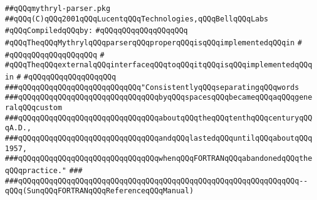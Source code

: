 \label{src/lib/compiler/front/parser/main/mythryl-parser.pkg}
\verb|##qQQqmythryl-parser.pkg|\newline
\verb|##qQQq(C)qQQq2001qQQqLucentqQQqTechnologies,qQQqBellqQQqLabs|\newline
\newline
\verb|#qQQqCompiledqQQqby:|\newline
\verb|#qQQqqQQqqQQqqQQqqQQq|\newline
\newline
\newline
\newline
\verb|#qQQqTheqQQqMythrylqQQqparserqQQqproperqQQqisqQQqimplementedqQQqin|\newline
\verb|#|\newline
\verb|#qQQqqQQqqQQqqQQqqQQq|\newline
\verb|#|\newline
\verb|#qQQqTheqQQqexternalqQQqinterfaceqQQqtoqQQqitqQQqisqQQqimplementedqQQqin|\newline
\verb|#|\newline
\verb|#qQQqqQQqqQQqqQQqqQQq|\newline
\newline
\newline
\newline
\verb|###qQQqqQQqqQQqqQQqqQQqqQQqqQQq"ConsistentlyqQQqseparatingqQQqwords|\newline
\verb|###qQQqqQQqqQQqqQQqqQQqqQQqqQQqqQQqbyqQQqspacesqQQqbecameqQQqaqQQqgeneralqQQqcustom|\newline
\verb|###qQQqqQQqqQQqqQQqqQQqqQQqqQQqqQQqaboutqQQqtheqQQqtenthqQQqcenturyqQQqA.D.,|\newline
\verb|###qQQqqQQqqQQqqQQqqQQqqQQqqQQqqQQqandqQQqlastedqQQquntilqQQqaboutqQQq1957,|\newline
\verb|###qQQqqQQqqQQqqQQqqQQqqQQqqQQqqQQqwhenqQQqFORTRANqQQqabandonedqQQqtheqQQqpractice."|\newline
\verb|###|\newline
\verb|###qQQqqQQqqQQqqQQqqQQqqQQqqQQqqQQqqQQqqQQqqQQqqQQqqQQqqQQqqQQqqQQq--qQQq(SunqQQqFORTRANqQQqReferenceqQQqManual)|\newline
\newline
